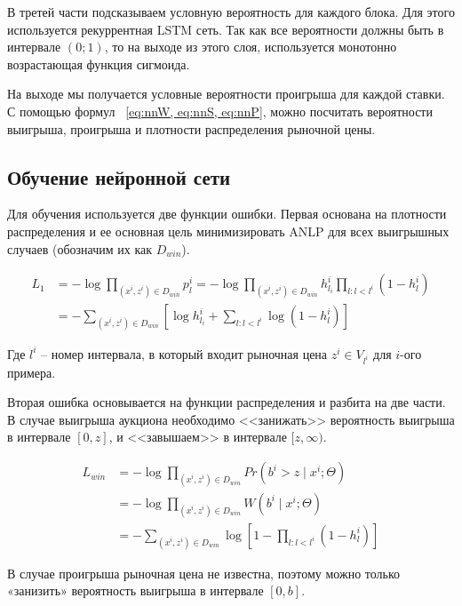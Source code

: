 \documentclass[times,specification,annotation]{itmo-student-thesis}
\begin{document}
В третей части подсказываем условную вероятность для каждого блока. 
Для этого используется рекуррентная LSTM сеть. 
Так как все вероятности должны быть в интервале $(0;1)$, то на выходе из этого слоя, используется монотонно возрастающая функция сигмоида.

На выходе мы получается условные вероятности проигрыша для каждой ставки. 
С помощью формул ~\cref{eq:nnW, eq:nnS, eq:nnP}, можно посчитать вероятности выигрыша, проигрыша и плотности распределения рыночной цены.

\subsection{Обучение нейронной сети}

Для обучения используется две функции ошибки. 
Первая основана на плотности распределения и ее основная цель минимизировать ANLP для всех выигрышных случаев (обозначим их как $D_{win}$).

\begin{equation}
    \begin{split}
        L_1 & = - \log \prod_{(x^i, z^i) \in D_{win}} p_l^i = - \log \prod_{(x^i, z^i) \in D_{win}} h_{l_i}^i \prod_{l: l < l^i} (1 - h_l^i) \\
        & = - \sum_{(x^i, z^i) \in D_{win}} \left[\log h_{l_i}^i + \sum_{l: l < l^i} \log (1 - h_l^i)\right]
    \end{split}
\end{equation}

Где $l^i$ – номер интервала, в который входит рыночная цена $z^i \in V_{l^i}$ для $i$-ого примера.

Вторая ошибка основывается на функции распределения и разбита на две части. 
В случае выигрыша аукциона необходимо <<занижать>> вероятность выигрыша в интервале $[0, z]$, и <<завышаем>> в интервале $[z, \infty)$.

\begin{equation}
    \begin{split}
        L_{win} & = - \log \prod_{(x^i, z^i) \in D_{win}} Pr(b^i > z \mid x^i; \Theta) \\
        & = - \log \prod_{(x^i, z^i) \in D_{win}} W(b^i \mid x^i; \Theta) \\
        & = - \sum_{(x^i, z^i) \in D_{win}} \log \left[1 - \prod_{l: l < l^i} (1 - h_l^i)\right]
    \end{split}
\end{equation}

В случае проигрыша рыночная цена не известна, поэтому можно только «занизить» вероятность выигрыша в интервале $[0, b]$.
\end{document}
